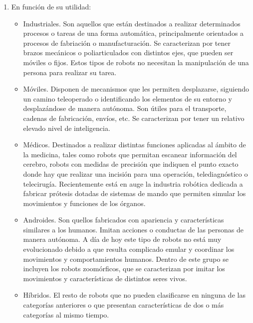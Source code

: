 \documentclass{report}
\begin{document}
\begin{enumerate}
	\item En función de su utilidad:
	\begin{itemize}
		\item Industriales. Son aquellos que están destinados a realizar determinados procesos o tareas de una forma automática, principalmente orientados a procesos de fabriación o manufacturación. Se caracterizan por tener brazos mecánicos o poliarticulados con distintos ejes, que pueden ser móviles o fijos. Estos tipos de robots no necesitan la manipulación de una persona para realizar su tarea.
		
		\item Móviles. Disponen de mecanismos que les permiten desplazarse, siguiendo un camino teleoperado o identificando los elementos de su entorno y desplazándose de manera autónoma. Son útiles para el transporte, cadenas de fabricación, envíos, etc. Se caracterizan por tener un relativo elevado nivel de inteligencia.
		
		\item Médicos. Destinados a realizar distintas funciones aplicadas al ámbito de la medicina, tales como robots que permitan escanear información del cerebro, robots con medidas de precisión que indiquen el punto exacto donde hay que realizar una incisión para una operación, telediagnóstico o telecirugía. Recientemente está en auge la industria robótica dedicada a fabricar prótesis dotadas de sistemas de mando que permiten simular los movimientos y funciones de los órganos.
		
		\item Androides. Son quellos fabricados con apariencia y características similares a los humanos. Imitan acciones o conductas de las personas de manera autónoma. A día de hoy este tipo de robots no está muy evolucionado debido a que resulta complicado emular y coordinar los movimientos y comportamientos humanos. Dentro de este grupo se incluyen los robots zoomórficos, que se caracterizan por imitar los movimientos y características de distintos seres vivos.
		 
		\item Híbridos. El resto de robots que no pueden clasificarse en ninguna de las categorías anteriores o que presentan características de dos o más categorías al mismo tiempo.


\end{itemize}
\end{enumerate}
\end{document}
